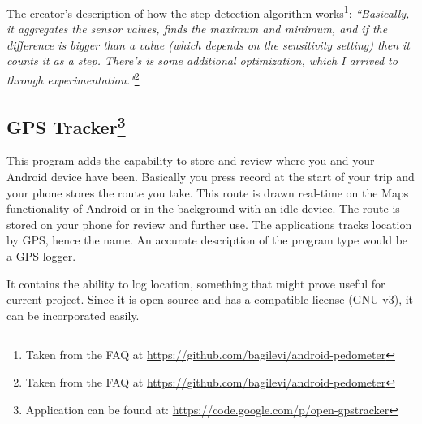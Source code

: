 The creator's description of how the step detection algorithm works\footnote{Taken from the FAQ at \url{https://github.com/bagilevi/android-pedometer}}: \textit{``Basically, it aggregates the sensor values, finds the maximum and minimum, and if the difference is bigger than a value (which depends on the sensitivity setting) then it counts it as a step. There's is some additional optimization, which I arrived to through experimentation."}\footnote{Taken from the FAQ at \url{https://github.com/bagilevi/android-pedometer}}

\subsection{GPS Tracker\footnote{Application can be found at: \url{https://code.google.com/p/open-gpstracker}}}
This program adds the capability to store and review where you and your Android device have been. Basically you press record at the start of your trip and your phone stores the route you take. This route is drawn real-time on the Maps functionality of Android or in the background with an idle device. The route is stored on your phone for review and further use. The applications tracks location by GPS, hence the name. An accurate description of the program type would be a GPS logger.

It contains the ability to log location, something that might prove useful for current project. Since it is open source and has a compatible license (GNU v3), it can be incorporated easily.